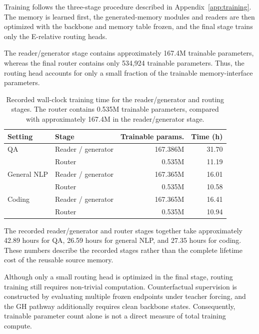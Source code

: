 Training follows the three-stage procedure described in
Appendix~\ref{app:training}. The memory is learned first, the generated-memory
modules and readers are then optimized with the backbone and memory table
frozen, and the final stage trains only the E-relative routing heads.

The reader/generator stage contains approximately 167.4M trainable parameters,
whereas the final router contains only 534,924 trainable parameters.
Thus, the routing head accounts for only a small fraction of the trainable
memory-interface parameters.

\begin{table}[t]
\centering
\caption{
Recorded wall-clock training time for the reader/generator and routing stages.
The router contains 0.535M trainable parameters, compared with approximately
167.4M in the reader/generator stage.
}
\label{tab:training-cost}
\small
\setlength{\tabcolsep}{6pt}
\begin{tabular}{@{}llrr@{}}
\toprule
\textbf{Setting}
& \textbf{Stage}
& \textbf{Trainable params.}
& \textbf{Time (h)} \\
\midrule
QA
& Reader / generator
& 167.386M
& 31.70 \\
& Router
& 0.535M
& 11.19 \\
\addlinespace

General NLP
& Reader / generator
& 167.365M
& 16.01 \\
& Router
& 0.535M
& 10.58 \\
\addlinespace

Coding
& Reader / generator
& 167.365M
& 16.41 \\
& Router
& 0.535M
& 10.94 \\
\bottomrule
\end{tabular}
\end{table}

The recorded reader/generator and router stages together take approximately
42.89 hours for QA, 26.59 hours for general NLP, and 27.35 hours for coding.
These numbers describe the recorded stages rather than the complete lifetime
cost of the reusable source memory.

Although only a small routing head is optimized in the final stage, routing
training still requires non-trivial computation. Counterfactual supervision is
constructed by evaluating multiple frozen endpoints under teacher forcing, and
the GH pathway additionally requires clean backbone states. Consequently,
trainable parameter count alone is not a direct measure of total training
compute.

